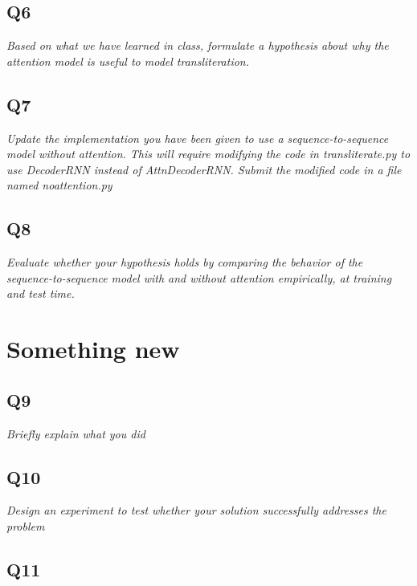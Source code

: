 \documentclass[12pt]{article}
\begin{document}
\subsection{Q6}
\textit{
Based on what we have learned in class, formulate a hypothesis about why the attention model is useful to model transliteration.	
}

\subsection{Q7}
\textit{
Update the implementation you have been given to use a sequence-to-sequence model without attention.  This will require modifying the code in transliterate.py to use DecoderRNN instead of AttnDecoderRNN.  Submit the modified code in a file named noattention.py
}

\subsection{Q8}
\textit{
Evaluate whether your hypothesis holds by comparing the behavior of the sequence-to-sequence model with and without attention empirically, at training and test time.
}

\section{Something new}

\subsection{Q9}
\textit{Briefly explain what you did}

\subsection{Q10}
\textit{Design an experiment to test whether your solution successfully addresses the problem}

\subsection{Q11}
\textit{}
\end{document}
